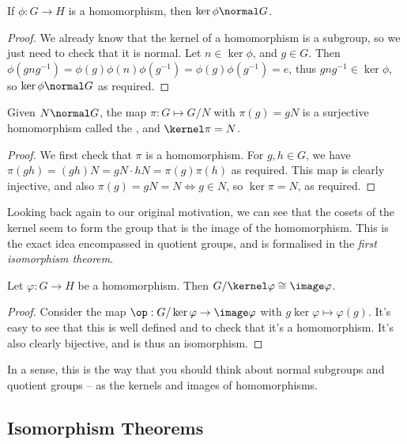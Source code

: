 \documentclass[a4paper]{scrartcl}
\begin{document}
\begin{theorem*}
	If $\phi: G \rightarrow H$ is a homomorphism, then $\ker \phi \normal G$.
\end{theorem*}
\begin{proof}
	We already know that the kernel of a homomorphism is a subgroup, so we just need to check that it is normal. Let $n \in \ker \phi$, and $g \in G$. Then $\phi(gng^{-1}) = \phi(g) \phi(n)\phi(g^{-1}) = \phi(g) \phi(g^{-1}) = e$, thus $gng^{-1} \in \ker \phi$, so $\ker \phi \normal G$ as required.
\end{proof}

\begin{theorem*}
	Given $N \normal G$, the map $\pi: G \mapsto G/N$ with $\pi(g) = gN$ is a surjective homomorphism called the , and $\kernel \pi = N$. 
\end{theorem*}
\begin{proof}
We first check that $\pi$ is a homomorphism. For $g, h \in G$, we have $\pi(gh) = (gh)N = gN \cdot hN = \pi(g) \pi(h)$ as required. This map is clearly injective, and also $\pi(g) = gN = N \iff g \in N$, so $\ker \pi = N$, as required.
\end{proof}


Looking back again to our original motivation, we can see that the cosets of the kernel seem to form the group that is the image of the homomorphism. This is the exact idea encompassed in quotient groups, and is formalised in the \emph{first isomorphism theorem}.

\begin{theorem*}
	Let $\varphi:G \rightarrow H$ be a homomorphism. Then $G/\kernel \varphi \cong \image \varphi$.
\end{theorem*}
\begin{proof}
	Consider the map $\op: G/\ker\varphi \rightarrow \image \varphi$ with $g\ker\varphi \mapsto \varphi(g)$. It's easy to see that this is well defined and to check that it's a homomorphism. It's also clearly bijective, and is thus an isomorphism.
\end{proof}

In a sense, this is the way that you should think about normal subgroups and quotient groups -- as the kernels and images of homomorphisms.


\subsection{Isomorphism Theorems}
\end{document}
